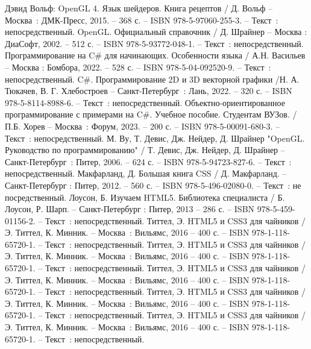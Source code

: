 
\begin{thebibliography}{9}

    	Дэвид Вольф: OpenGL 4. Язык шейдеров. Книга рецептов / Д. Вольф – Москва~: ДМК-Пресс, 2015. – 368 с. – ISBN 978-5-97060-255-3. – Текст~: непосредственный.
    	OpenGL. Официальный справочник / Д. Шрайнер – Москва : ДиаСофт, 2002. – 512 с. – ISBN 978-5-93772-048-1. – Текст~: непосредственный.
    	Программирование на C\# для начинающих. Особенности языка / А.Н. Васильев  – Москва : Бомбора, 2022. – 528 с. – ISBN 978-5-04-092520-9. – Текст~: непосредственный.
    	C\#. Программирование 2D и 3D векторной графики /Н. А. Тюкачев, В. Г. Хлебостроев – Санкт-Петербург~: Лань, 2022. – 320 с. – ISBN 978-5-8114-8988-6. – Текст~: непосредственный.
		Объектно-ориентированное программирование с примерами на C\#. Учебное пособие. Студентам ВУЗов. / П.Б. Хорев – Москва~: Форум, 2023. – 200 с. – ISBN 978-5-00091-680-3. – Текст~: непосредственный.
		М. Ву, Т. Девис, Дж. Нейдер, Д. Шрайнер "OpenGL. Руководство по программированию" / Т. Девис, Дж. Нейдер, Д. Шрайнер – Санкт-Петербург~: Питер, 2006. – 624 с. – ISBN 978-5-94723-827-6. – Текст~: непосредственный.
		Макфарланд, Д. Большая книга CSS / Д. Макфарланд. – Санкт-Петербург : Питер, 2012. – 560 с. – ISBN 978-5-496-02080-0. – Текст~: не	посредственный.
		Лоусон, Б. Изучаем HTML5. Библиотека специалиста / Б. Лоусон, Р. Шарп. – Санкт-Петербург : Питер, 2013 – 286 с. – ISBN 978-5-459-01156-2. – Текст~: непосредственный.
		Титтел, Э. HTML5 и CSS3 для чайников / Э. Титтел, К. Минник. – Москва~: Вильямс, 2016 – 400 с. – ISBN 978-1-118-65720-1. – Текст~: непосредственный.    
		Титтел, Э. HTML5 и CSS3 для чайников / Э. Титтел, К. Минник. – Москва~: Вильямс, 2016 – 400 с. – ISBN 978-1-118-65720-1. – Текст~: непосредственный.    
		Титтел, Э. HTML5 и CSS3 для чайников / Э. Титтел, К. Минник. – Москва~: Вильямс, 2016 – 400 с. – ISBN 978-1-118-65720-1. – Текст~: непосредственный.    
		Титтел, Э. HTML5 и CSS3 для чайников / Э. Титтел, К. Минник. – Москва~: Вильямс, 2016 – 400 с. – ISBN 978-1-118-65720-1. – Текст~: непосредственный.    
		Титтел, Э. HTML5 и CSS3 для чайников / Э. Титтел, К. Минник. – Москва~: Вильямс, 2016 – 400 с. – ISBN 978-1-118-65720-1. – Текст~: непосредственный.
\end{thebibliography}
